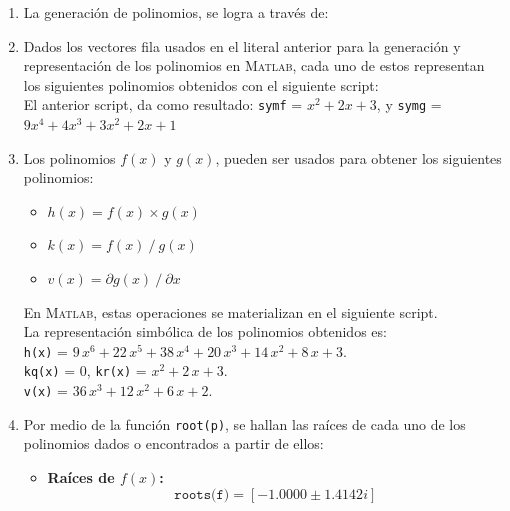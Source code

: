 \documentclass[11pt, spanish]{article}
\begin{document}
\begin{enumerate}
\item La generación de polinomios, se logra a través de:\\



\item Dados los vectores fila usados en el literal anterior para la generación y representación de los polinomios en \textsc{Matlab}, cada uno de estos representan los siguientes polinomios obtenidos con el siguiente script:\\



El anterior script, da como resultado: \texttt{symf} = $x^2 + 2x + 3$, y \texttt{symg} = $9x^4 + 4x^3 + 3x^2 + 2x + 1$

\newpage
\item Los polinomios $f(x)$ y $g(x)$, pueden ser usados para obtener los siguientes polinomios:

\begin{itemize}
\item $h(x) = f(x) \times g(x)$
\item $k(x) = f(x)\ /\ g(x)$
\item $v(x) = \partial g(x)\ /\ \partial x$
\end{itemize}

En \textsc{Matlab}, estas operaciones se materializan en el siguiente script.\\



La representación simbólica de los polinomios obtenidos es:\\

\texttt{h(x)} = $9\, x^6 + 22\, x^5 + 38\, x^4 + 20\, x^3 + 14\, x^2 + 8\, x + 3$.\\

\texttt{kq(x)} = $0$, \texttt{kr(x)} = $x^2 + 2\, x + 3$.\\

\texttt{v(x)} = $36\, x^3 + 12\, x^2 + 6\, x + 2$.

\item Por medio de la función \texttt{root(p)}, se hallan las raíces de cada uno de los polinomios dados o encontrados a partir de ellos:

\begin{itemize}
\item \textbf{Raíces de $f(x)$:} $$\texttt{roots(f)} = [-1.0000 \pm 1.4142i]$$


\end{itemize}
\end{enumerate}
\end{document}
